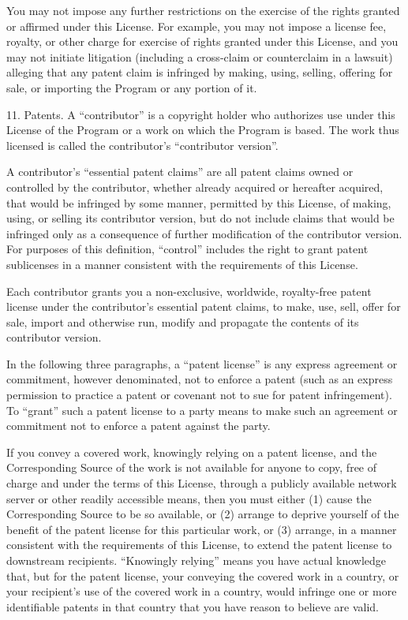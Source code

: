 You may not impose any further restrictions on the exercise of the rights granted or affirmed under this License. For example, you may not impose a license fee, royalty, or other charge for exercise of rights granted under this License, and you may not initiate litigation (including a cross-claim or counterclaim in a lawsuit) alleging that any patent claim is infringed by making, using, selling, offering for sale, or importing the Program or any portion of it.

11. Patents.
A “contributor” is a copyright holder who authorizes use under this License of the Program or a work on which the Program is based. The work thus licensed is called the contributor's “contributor version”.

A contributor's “essential patent claims” are all patent claims owned or controlled by the contributor, whether already acquired or hereafter acquired, that would be infringed by some manner, permitted by this License, of making, using, or selling its contributor version, but do not include claims that would be infringed only as a consequence of further modification of the contributor version. For purposes of this definition, “control” includes the right to grant patent sublicenses in a manner consistent with the requirements of this License.

Each contributor grants you a non-exclusive, worldwide, royalty-free patent license under the contributor's essential patent claims, to make, use, sell, offer for sale, import and otherwise run, modify and propagate the contents of its contributor version.

In the following three paragraphs, a “patent license” is any express agreement or commitment, however denominated, not to enforce a patent (such as an express permission to practice a patent or covenant not to sue for patent infringement). To “grant” such a patent license to a party means to make such an agreement or commitment not to enforce a patent against the party.

If you convey a covered work, knowingly relying on a patent license, and the Corresponding Source of the work is not available for anyone to copy, free of charge and under the terms of this License, through a publicly available network server or other readily accessible means, then you must either (1) cause the Corresponding Source to be so available, or (2) arrange to deprive yourself of the benefit of the patent license for this particular work, or (3) arrange, in a manner consistent with the requirements of this License, to extend the patent license to downstream recipients. “Knowingly relying” means you have actual knowledge that, but for the patent license, your conveying the covered work in a country, or your recipient's use of the covered work in a country, would infringe one or more identifiable patents in that country that you have reason to believe are valid.

